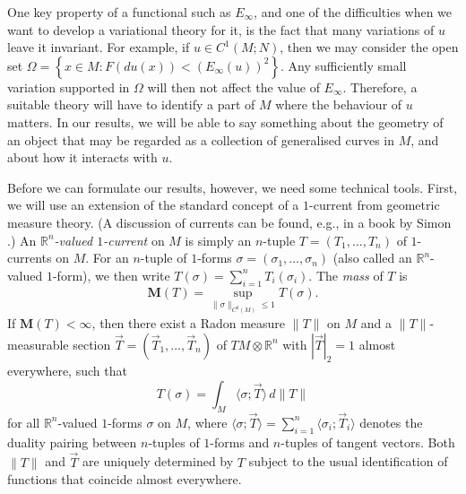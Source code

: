 \documentclass[a4paper]{article}
\newcommand{\R}{\mathbb{R}}
\newcommand{\M}{\mathbf{M}}
\newcommand{\pairing}[2]{\langle #1; #2 \rangle}
\newcommand{\set}[2]{\left\{ #1 \colon #2 \right\}}
\theoremstyle{definition}
\theoremstyle{remark}
\begin{document}
One key property of a functional such as $E_\infty$, and one of the difficulties
when we want to develop a variational theory for it, is the fact that
many variations of $u$ leave it invariant. For example, if $u \in C^1(M; N)$,
then we may consider the open set $\Omega = \set{x \in M}{F(du(x)) < (E_\infty(u))^2}$.
Any sufficiently small variation supported in $\Omega$ will then not affect
the value of $E_\infty$. Therefore, a suitable theory will have to
identify a part of $M$ where the behaviour of $u$ matters. In our results, we will be able to say something
about the geometry of an object that may be regarded as a collection of
generalised curves in $M$, and about how it interacts with $u$.

Before we can formulate our results, however, we need some technical tools.
First, we will use an extension of the standard concept of a $1$-current from geometric measure theory.
(A discussion of currents can be found, e.g., in a book by Simon \cite{Simon:83}.)
An \emph{$\R^n$-valued $1$-current} on $M$ is simply an $n$-tuple $T = (T_1, \dotsc, T_n)$
of $1$-currents on $M$. For an $n$-tuple of $1$-forms $\sigma = (\sigma_1, \dotsc, \sigma_n)$ (also called an $\R^n$-valued $1$-form), we then write
$T(\sigma) = \sum_{i = 1}^n T_i(\sigma_i)$. The \emph{mass} of $T$ is
\[
\M(T) = \sup_{\|\sigma\|_{C^0(M)} \le 1} T(\sigma).
\]
If $\M(T) < \infty$, then there exist a Radon measure $\|T\|$ on $M$ and a $\|T\|$-measurable section $\vec{T} = (\vec{T}_1, \dotsc, \vec{T}_n)$ of $TM \otimes \R^n$ with $|\vec{T}|_2 = 1$ almost everywhere, such that
\[
T(\sigma) = \int_M \pairing{\sigma}{\vec{T}} \, d\|T\|
\]
for all $\R^n$-valued $1$-forms $\sigma$ on $M$, where
$\pairing{\sigma}{\vec{T}} = \sum_{i = 1}^n \pairing{\sigma_i}{\vec{T}_i}$
denotes the duality pairing between $n$-tuples of $1$-forms and $n$-tuples of
tangent vectors.
Both $\|T\|$ and $\vec{T}$ are uniquely determined by $T$ subject to the
usual identification of functions that coincide almost everywhere.
\end{document}
